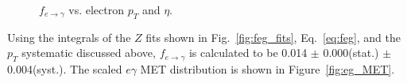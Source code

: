\documentclass[dissertation.tex]{subfiles}
\begin{document}
\begin{figure}
	\centering
	\hspace{1cm}
	\caption{$f_{e\rightarrow\gamma}$ vs. electron $p_{T}$ and $\eta$.}
	\label{fig:feg_vs_pT_eta}
\end{figure}

Using the integrals of the $Z$ fits shown in Fig.~\ref{fig:feg_fits}, Eq.~\ref{eq:feg}, and the $p_{T}$ systematic discussed above, $f_{e\rightarrow\gamma}$ is calculated to be 0.014 $\pm$ 0.000(stat.) $\pm$ 0.004(syst.).  The scaled $e\gamma$ MET distribution is shown in Figure~\ref{fig:eg_MET}.
\end{document}
